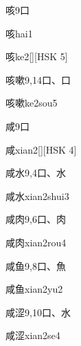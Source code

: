 \begin{entry}{咳}{9}{⼝}
  \begin{phonetics}{咳}{hai1}
  \end{phonetics}
  \begin{phonetics}{咳}{ke2}[][HSK 5]
  \end{phonetics}
\end{entry}

\begin{entry}{咳嗽}{9,14}{⼝、⼝}
  \begin{phonetics}{咳嗽}{ke2sou5}
  \end{phonetics}
\end{entry}

\begin{entry}{咸}{9}{⼝}
  \begin{phonetics}{咸}{xian2}[][HSK 4]
  \end{phonetics}
\end{entry}

\begin{entry}{咸水}{9,4}{⼝、⽔}
  \begin{phonetics}{咸水}{xian2shui3}
  \end{phonetics}
\end{entry}

\begin{entry}{咸肉}{9,6}{⼝、⾁}
  \begin{phonetics}{咸肉}{xian2rou4}
  \end{phonetics}
\end{entry}

\begin{entry}{咸鱼}{9,8}{⼝、⿂}
  \begin{phonetics}{咸鱼}{xian2yu2}
  \end{phonetics}
\end{entry}

\begin{entry}{咸涩}{9,10}{⼝、⽔}
  \begin{phonetics}{咸涩}{xian2se4}
  \end{phonetics}
\end{entry}

